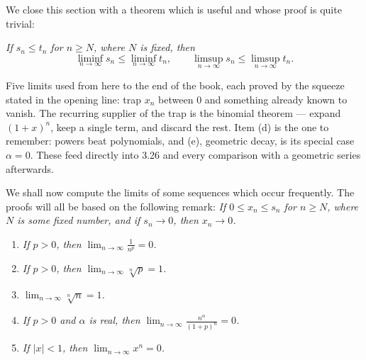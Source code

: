 We close this section with a theorem which is useful and whose proof is quite
trivial:

\emph{If $s_n \le t_n$ for $n \ge N$, where $N$ is fixed, then}
\[ \liminf_{n\to\infty} s_n \le \liminf_{n\to\infty} t_n, \qquad
   \limsup_{n\to\infty} s_n \le \limsup_{n\to\infty} t_n. \]


\begin{signpost}
Five limits used from here to the end of the book, each proved by the squeeze
stated in the opening line: trap $x_n$ between $0$ and something already known
to vanish. The recurring supplier of the trap is the binomial theorem ---
expand $(1+x)^n$, keep a single term, and discard the rest. Item (d) is the
one to remember: powers beat polynomials, and (e), geometric decay, is its
special case $\alpha = 0$. These feed directly into 3.26 and every comparison
with a geometric series afterwards.
\end{signpost}

\noindent
We shall now compute the limits of some sequences which occur frequently. The
proofs will all be based on the following remark: \emph{If $0 \le x_n \le s_n$
for $n \ge N$, where $N$ is some fixed number, and if $s_n \to 0$, then
$x_n \to 0$.}

\begin{enumerate}[label=(\alph*), leftmargin=2.2em, itemsep=2pt, topsep=3pt]
  \item \emph{If $p > 0$, then $\displaystyle\lim_{n\to\infty} \frac{1}{n^p} = 0$.}
  \item \emph{If $p > 0$, then $\displaystyle\lim_{n\to\infty} \sqrt[n]{p} = 1$.}
  \item \emph{$\displaystyle\lim_{n\to\infty} \sqrt[n]{n} = 1$.}
  \item \emph{If $p > 0$ and $\alpha$ is real, then
        $\displaystyle\lim_{n\to\infty} \frac{n^\alpha}{(1+p)^n} = 0$.}
  \item \emph{If $|x| < 1$, then $\displaystyle\lim_{n\to\infty} x^n = 0$.}
\end{enumerate}

